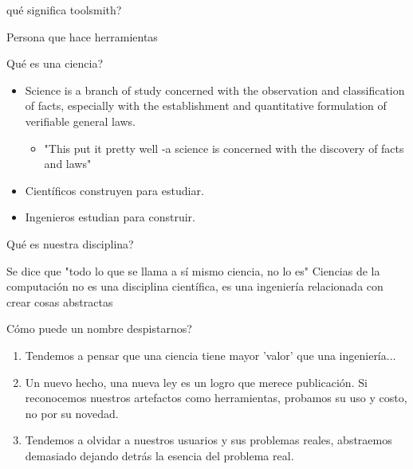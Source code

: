 \documentclass{beamer}
\begin{document}
\begin{frame}{qué significa toolsmith?}
\begin{center}
Persona que hace herramientas
\end{center}
\end{frame}

\begin{frame}{Qué es una ciencia?}
\begin{itemize}
\item Science is a branch of study concerned with the observation and 
classification of facts, especially with the establishment and 
quantitative formulation of verifiable general laws.

	\begin{itemize}
	\item "This put it pretty well -a science is concerned with the
		discovery of facts and laws"
	\end{itemize}

\item Científicos construyen para estudiar.
\item Ingenieros estudian para construir.
\end{itemize}
\end{frame}

\begin{frame}{Qué es nuestra disciplina?}
\begin{center}
Se dice que "todo lo que se llama a sí mismo ciencia, no lo es"
\newline
\newline
Ciencias de la computación no es una disciplina científica, 
\newline
es una ingeniería relacionada con crear cosas abstractas
\end{center}
\end{frame}

\begin{frame}{Cómo puede un nombre despistarnos?}
\begin{center}
\begin{enumerate}
\item Tendemos a pensar que una ciencia tiene mayor 'valor'
que una ingeniería...
\item Un nuevo hecho, una nueva ley es un logro que
merece publicación.
Si reconocemos nuestros artefactos como herramientas, 
probamos su uso y costo, no por su novedad.
\item Tendemos a olvidar a nuestros usuarios y sus problemas reales,
abstraemos demasiado dejando detrás la esencia del problema real.
\end{enumerate}
\end{center}
\end{frame}
\end{document}
